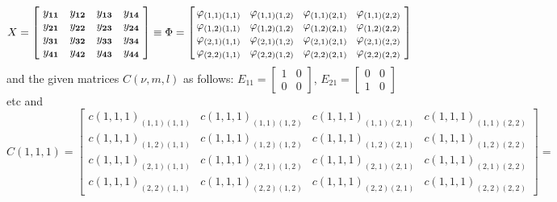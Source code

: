 \documentclass[12pt]{amsart}
\theoremstyle{definition}
\begin{document}
$$X=   \left[ \! \begin{array}{cccc}
y_{\bf 11} & y_{\bf 12} & y_{\bf 13} & y_{\bf 14} \\
y_{\bf 21} & y_{\bf 22} & y_{\bf 23} & y_{\bf 24} \\
y_{\bf 31} & y_{\bf 32} & y_{\bf 33} & y_{\bf 34} \\
y_{\bf 41} & y_{\bf 42} & y_{\bf 43} & y_{\bf 44} 
\end{array}\!\right] \equiv \Phi =
 \left[ \! \begin{array}{cccc}
\!\varphi_{( 1, 1)(1 ,1 )} & \!\varphi_{(1 ,1 )(1 ,2 )} & \!\varphi_{(1 ,1 )(2 ,1 )} & \!\varphi_{(1 ,1 )(2 ,2 )} \\
\!\varphi_{( 1, 2)(1 ,1 )} & \!\varphi_{(1 ,2 )(1 ,2 )} & \!\varphi_{(1 ,2 )(2 ,1 )} & \!\varphi_{(1 ,2 )(2 ,2 )} \\
\!\varphi_{( 2, 1)(1 ,1 )} & \!\varphi_{(2 ,1 )(1 ,2 )} & \!\varphi_{(2 ,1 )(2 ,1 )} & \!\varphi_{(2 ,1 )(2 ,2 )} \\
\!\varphi_{( 2, 2)(1 ,1 )} & \!\varphi_{(2 ,2 )(1 ,2 )} & \!\varphi_{(2 ,2 )(2 ,1 )} & \!\varphi_{(2 ,2 )(2 ,2 )} 
\end{array}\!\right]
$$
and the given matrices $C({\nu ,m,l})$  as follows: $E_{11}=\left[ \begin{array}{cc}
1&0\\0&0\end{array}\right]$, $E_{21}=\left[ \begin{array}{cc}0&0\\1&0\end{array}
\right]$ etc and 
$$
C({1,1,1})\! =\! \left[ \begin{array}{cccc} \! c({1,1,1})_{( 1,1 )(1 ,1 )} & \! c({1,1,1})_{(1 ,1 )(1 ,2 )} & \! c({1,1,1})_{(1 ,1 )(2 ,1 )} & \! c({1,1,1})_{(1 ,1 )(2 ,2 )} \\
 \! c({1,1,1})_{(1 ,2 )(1 ,1 )} & \! c({1,1,1})_{( 1,2 )(1 ,2 )} & \! c({1,1,1})_{(1 ,2 )(2 ,1 )} & \! c({1,1,1})_{(1 ,2 )(2,2 )} \\
 \! c({1,1,1})_{(2 ,1 )(1 ,1 )} & \! c({1,1,1})_{( 2, 1)(1 ,2 )} & \! c({1,1,1})_{(2 ,1 )(2 ,1 )} & \! c({1,1,1})_{(2 ,1 )(2,2 )} \\
 \! c({1,1,1})_{(2 , 2)(1 ,1 )} &\! c({1,1,1})_{(2 ,2 )(1 ,2 )} &\! c({1,1,1})_{(2 ,2 )(2 ,1 )} &\! c({1,1,1})_{(2 ,2 )(2 ,2 )} 
\end{array}\! \right] =$$ 
\end{document}
